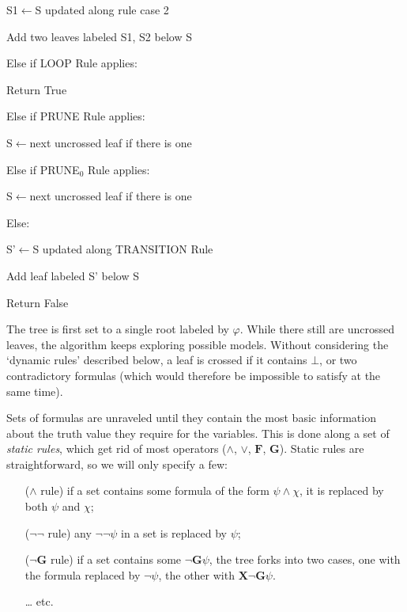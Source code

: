 \documentclass[11pt]{article}
\newcommand{\X}{{\mathbf{X}}}
\newcommand{\F}{{\mathbf{F}}}
\newcommand{\orr}{{\vee}}
\newcommand{\andd}{{\wedge}}
\newcommand{\phii}{{\varphi}}
\newcommand{\G}{{\mathbf{G}}}
\theoremstyle{definition}
\begin{document}
{\hspace*{1cm}\hspace*{1cm}        S1$\gets$S updated along rule case 2
        
\hspace*{1cm}\hspace*{1cm}        Add two leaves labeled S1, S2 below S

\hspace*{1cm}    Else if LOOP Rule applies:

\hspace*{1cm}\hspace*{1cm}      Return True

\hspace*{1cm}   Else if PRUNE Rule applies:

\hspace*{1cm}\hspace*{1cm}      S$\gets$next uncrossed leaf if there is one

\hspace*{1cm}   Else if {PRUNE}$_0$ Rule applies:

\hspace*{1cm}\hspace*{1cm}       S$\gets$next uncrossed leaf if there is one

\hspace*{1cm}   Else:

\hspace*{1cm}\hspace*{1cm}      S'$\gets$S updated along TRANSITION Rule

\hspace*{1cm}\hspace*{1cm}      Add leaf labeled S' below S

Return False \newline

}

The tree is first set to a single root labeled by $\phii$. While there still are uncrossed leaves, the algorithm keeps exploring possible models.
Without considering the `dynamic rules' described below, a leaf is crossed if it contains $\bot$, or two contradictory formulas (which would
therefore be impossible to satisfy at the same time). 

Sets of formulas are unraveled until they contain the most basic information about the truth value they require for the variables. This is done along 
a set of \emph{static rules}, which get rid of most operators ($\andd$, $\orr$, $\F$, $\G$). Static rules are straightforward, so we will only specify a few: 
\begin{itemize}
    \item [($\andd$ rule)] if a set contains some formula of the form $\psi\andd\chi$, it is replaced by both $\psi$ and $\chi$;
    \item [($\neg\neg$ rule)] any $\neg\neg\psi$ in a set is replaced by $\psi$;
    \item [($\neg\G$ rule)] if a set contains some $\neg\G\psi$, the tree forks into two cases, one with the formula replaced by $\neg\psi$, the
    other with $\X\neg\G\psi$.
    \item [\ldots] etc.
\end{itemize}
\end{document}
